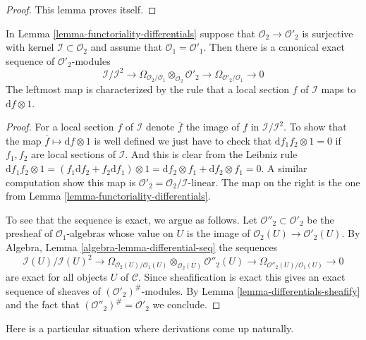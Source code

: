 \begin{proof}
This lemma proves itself.
\end{proof}

\begin{lemma}
\label{lemma-differential-seq}
In Lemma \ref{lemma-functoriality-differentials} suppose that
$\mathcal{O}_2 \to \mathcal{O}'_2$ is surjective with kernel
$\mathcal{I} \subset \mathcal{O}_2$ and assume that
$\mathcal{O}_1 = \mathcal{O}'_1$. Then there is a canonical exact
sequence of $\mathcal{O}'_2$-modules
$$
\mathcal{I}/\mathcal{I}^2
\longrightarrow
\Omega_{\mathcal{O}_2/\mathcal{O}_1} \otimes_{\mathcal{O}_2} \mathcal{O}'_2
\longrightarrow
\Omega_{\mathcal{O}'_2/\mathcal{O}_1}
\longrightarrow
0
$$
The leftmost map is characterized by the rule that a local section
$f$ of $\mathcal{I}$ maps to $\text{d}f \otimes 1$.
\end{lemma}

\begin{proof}
For a local section $f$ of $\mathcal{I}$ denote $\overline{f}$ the image of
$f$ in $\mathcal{I}/\mathcal{I}^2$. To show that the map
$\overline{f} \mapsto \text{d}f \otimes 1$ is well defined we just have to
check that $\text{d} f_1f_2 \otimes 1 = 0$ if $f_1, f_2$ are local sections
of $\mathcal{I}$. And this is clear from the Leibniz rule
$\text{d} f_1f_2 \otimes 1 =
(f_1 \text{d}f_2 + f_2 \text{d} f_1 )\otimes 1 =
\text{d}f_2 \otimes f_1 + \text{d}f_2 \otimes f_1 = 0$.
A similar computation show this map is
$\mathcal{O}'_2 = \mathcal{O}_2/\mathcal{I}$-linear. The map on the right
is the one from Lemma \ref{lemma-functoriality-differentials}.

\medskip\noindent
To see that the sequence is exact, we argue as follows. Let
$\mathcal{O}''_2 \subset \mathcal{O}'_2$ be the presheaf of
$\mathcal{O}_1$-algebras whose value on $U$ is the image of
$\mathcal{O}_2(U) \to \mathcal{O}'_2(U)$. By
Algebra, Lemma \ref{algebra-lemma-differential-seq}
the sequences
$$
\mathcal{I}(U)/\mathcal{I}(U)^2
\longrightarrow
\Omega_{\mathcal{O}_2(U)/\mathcal{O}_1(U)}
\otimes_{\mathcal{O}_2(U)} \mathcal{O}''_2(U)
\longrightarrow
\Omega_{\mathcal{O}''_2(U)/\mathcal{O}_1(U)}
\longrightarrow
0
$$
are exact for all objects $U$ of $\mathcal{C}$. Since sheafification is
exact this gives an exact sequence of sheaves of
$(\mathcal{O}'_2)^\#$-modules.
By Lemma \ref{lemma-differentials-sheafify}
and the fact that $(\mathcal{O}''_2)^\# = \mathcal{O}'_2$
we conclude.
\end{proof}

\noindent
Here is a particular situation where derivations come up
naturally.

